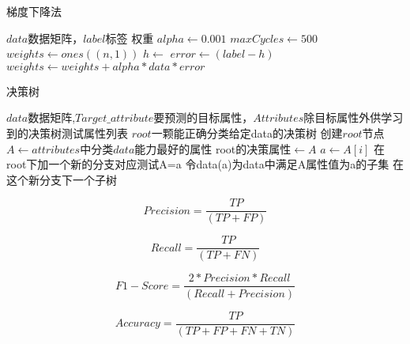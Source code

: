 \documentclass[11pt]{ctexart}
\begin{document}
  \begin{algorithm}
        \caption{梯度下降法}
        \begin{algorithmic}[1] %
            \Require $data$数据矩阵，$label$标签
            \Ensure 权重
                \State $alpha \gets 0.001$
                \State $maxCycles \gets 500$
                \State $weights \gets ones((n,1))$
                     \State $h  \gets $
                     \State $error \gets (label - h)$
                     \State $weights \gets weights+alpha*data*error$
                \EndFor
                \State {}
            \EndFunction    
        \end{algorithmic}
    \end{algorithm}

\begin{algorithm}
        \caption{决策树}
        \begin{algorithmic}[1] %
            \Require $data$数据矩阵,$Target\_attribute$要预测的目标属性，$Attributes$除目标属性外供学习到的决策树测试属性列表
            \Ensure $root$一颗能正确分类给定data的决策树
                \State 创建$root$节点
                		\State {}
		\EndIf
                		\State {}
		\EndIf
                		\State {}
		\EndIf
		\State $A \gets attributes$中分类$data$能力最好的属性
		\State root的决策属性$\gets A$
			\State $a\gets A[i]$
			\State 在root下加一个新的分支对应测试A=a
			\State 令data(a)为data中满足A属性值为a的子集
			\State 在这个新分支下一个子树
		\EndFor
                \State {}
            \EndFunction    
        \end{algorithmic}
    \end{algorithm}
    
$$Precision = \frac{TP}{(TP+FP)}$$

$$Recall = \frac{TP}{(TP+FN)}$$

$$F1-Score = \frac{2*Precision*Recall}{(Recall+Precision)}$$

$$Accuracy = \frac{TP}{(TP+FP+FN+TN)}$$
\end{document}
